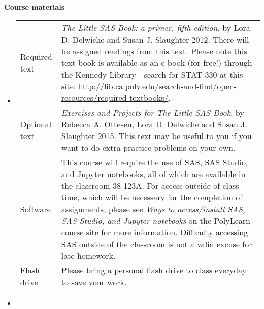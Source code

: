 \documentclass[letterpaper,12pt]{report}
\begin{document}
\textbf{Course materials}
\begin{itemize}
\item[]
\begin{tabular}{p{2cm} p{14cm}}
Required  text & \emph{The Little SAS Book: a primer, fifth edition}, by Lora D. Delwiche and Susan J. Slaughter 2012.  There will be assigned readings from this text.  Please note this text book is available as an e-book (for free!) through the Kennedy Library - search for STAT 330 at this site: \url{http://lib.calpoly.edu/search-and-find/open-resources/required-textbooks/}.\\
[1ex]
Optional text & \emph{Exercises and Projects for The Little SAS Book}, by Rebecca A. Ottesen, Lora D. Delwiche and Susan J. Slaughter 2015.  This text may be useful to you if you want to do extra practice problems on your own. \\
[1ex]
Software & This course will require the use of SAS, SAS Studio, and Jupyter notebooks, all of which are available in the classroom 38-123A.  For access outside of class time, which will be necessary for the completion of assignments, please see \emph{Ways to access/install SAS, SAS Studio, and Jupyter notebooks} on the PolyLearn course site for more information.  Difficulty accessing SAS outside of the classroom is not a valid excuse for late homework.\\
[1ex]
Flash drive & Please bring a personal flash drive to class everyday to save your work. \\
\end{tabular}
\item[]
\end{itemize}
\end{document}
